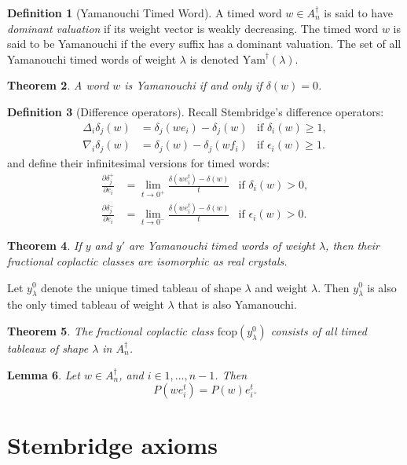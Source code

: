 \documentclass[12pt]{amsproc}
\newcommand{\Yam}{\mathrm{Yam}}
\newcommand{\fcop}{\mathrm{fcop}}
\newtheorem{theorem}{Theorem}
\newtheorem{lemma}[theorem]{Lemma}
\theoremstyle{definition}
\newtheorem{definition}[theorem]{Definition}
\begin{document}
\begin{definition}
  [Yamanouchi Timed Word]
  A timed word $w\in A_n^\dagger$ is said to have \emph{dominant valuation} if its weight vector is weakly decreasing.
  The timed word $w$ is said to be Yamanouchi if the every suffix has a dominant valuation.
  The set of all Yamanouchi timed words of weight $\lambda$ is denoted $\Yam^\dagger(\lambda)$.
\end{definition}
\begin{theorem}
  A word $w$ is Yamanouchi if and only if $\delta(w)=0$.
\end{theorem}
\begin{definition}
  [Difference operators]
  Recall Stembridge's difference operators:
  \begin{align*}
    \Delta_i\delta_j(w) & = \delta_j(we_i)-\delta_j(w) & \text{if } \delta_i(w)\geq 1,\\
    \nabla_i\delta_j(w) & = \delta_j(w)-\delta_j(wf_i) & \text{if } \epsilon_i(w)\geq 1.
  \end{align*}
  and define their infinitesimal versions for timed words:
  \begin{align*}
    \frac{\partial\delta_j^+}{\partial e_i} &= \lim_{t\to 0^+}\frac{\delta(we_i^t)-\delta(w)}t & \text{if } \delta_i(w)>0,\\
    \frac{\partial\delta_j^-}{\partial e_i} &= \lim_{t\to 0^-}\frac{\delta(we_i^t)-\delta(w)}t & \text{if } \epsilon_i(w)>0.
  \end{align*}
\end{definition}
\begin{theorem}
  If $y$ and $y'$ are Yamanouchi timed words of weight $\lambda$, then their fractional coplactic classes are isomorphic as real crystals.
\end{theorem}
Let $y^0_\lambda$ denote the unique timed tableau of shape $\lambda$ and weight $\lambda$.
Then $y^0_\lambda$ is also the only timed tableau of weight $\lambda$ that is also Yamanouchi.
\begin{theorem}
  The fractional coplactic class $\fcop(y^0_\lambda)$ consists of all timed tableaux of shape $\lambda$ in $A_n^\dagger$.
\end{theorem}
\begin{lemma}
  Let $w\in A_n^\dagger$, and $i\in 1,\dotsc, n-1$.
  Then
  \begin{displaymath}
    P(w e_i^t) = P(w) e_i^t.
  \end{displaymath}
\end{lemma}

\section{Stembridge axioms}
\label{sec:stembridge-axioms}
\end{document}
